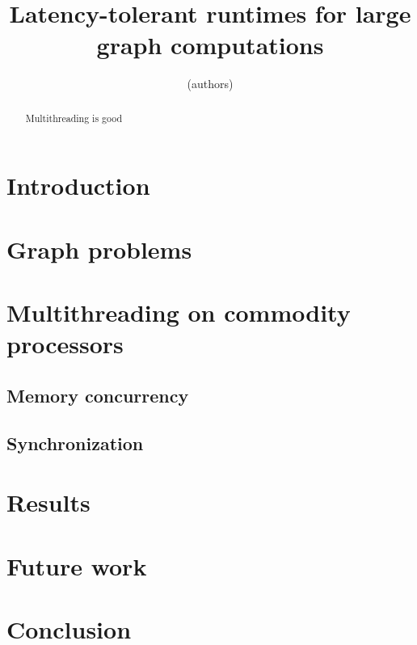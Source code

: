 \documentclass{acm_proc_article-sp}
\begin{document}
\title{Latency-tolerant runtimes for large graph computations}

\author{
(authors)
}

\maketitle
\begin{abstract}
Multithreading is good
\end{abstract}

\section{Introduction}

\section{Graph problems}


\section{Multithreading on commodity processors}

\subsection{Memory concurrency}
\subsection{Synchronization}

\section{Results}

\section{Future work}

\section{Conclusion}
\end{document}
